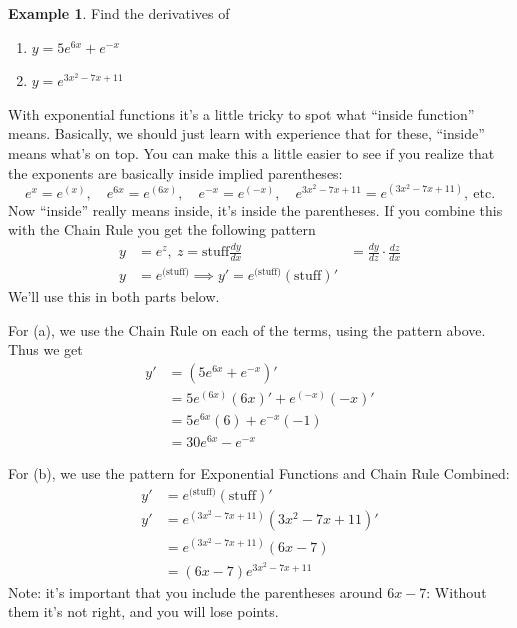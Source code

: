 \documentclass[oneside]{book}
\newcommand{\deriv}[2]{\frac{d#1}{d#2}}
\theoremstyle{definition}
\newtheorem{example}{Example}
\theoremstyle{solution}
\newtheorem*{solution}{Solution}
\newenvironment{solution}{\vspace{2in}\comment}{\endcomment}
\begin{document}
\begin{example}
Find the derivatives of 
\begin{enumerate}    
  \item $y = 5e^{6x} +e^{-x}$
  \item $y = e^{3x^2-7x+11}$
\end{enumerate}
\end{example}

\begin{solution} 
  With exponential functions it's a little tricky to spot what
  ``inside function'' means.  Basically, we should just learn with
  experience that for these, ``inside'' means what's on top.  You can
  make this a little easier to see if you realize that the exponents
  are basically inside implied parentheses:
$$
e^x = e^{(x)},\quad
e^{6x} = e^{(6x)},\quad
e^{-x} = e^{(-x)},\quad
e^{3x^2-7x+11} = e^{(3x^2-7x+11)},\ \text{etc.}
$$
Now ``inside'' really means inside, it's inside the parentheses.  If
you combine this with the Chain Rule you get the following pattern
  \begin{align*}
    y & = e^z,\ z=\text{stuff}
    \deriv{y}{x} & = \deriv{y}{z}\cdot \deriv{z}{x}\\
    y & = e^{\text{(stuff)}} \implies y' = e^{\text{(stuff)}} (\text{stuff})'
  \end{align*}
We'll use this in both parts below.
\bigskip

For (a), we use the Chain Rule on each of the terms, using the pattern
above.  Thus we get
\begin{align*}
  y' & =(5e^{6x}+e^{-x})'\\
     & = 5e^{(6x)}(6x)' + e^{(-x)}(-x)'\\
     & = 5e^{6x}(6)+e^{-x}(-1)\\
     & = 30e^{6x} - e^{-x}
\end{align*}
\bigskip

For (b), we use  the pattern for Exponential Functions and Chain Rule Combined:
\begin{align*}
  y' & = e^{\text{(stuff)}} (\text{stuff})'\\
  y' & =  e^{(3x^2-7x+11)}(3x^2-7x+11)'\\
     & =  e^{(3x^2-7x+11)}(6x-7)\\
     & = (6x-7)e^{3x^2-7x+11}
\end{align*}
Note: it's important that you include the parentheses around $6x-7$:
Without them it's not right, and you will lose points.
\end{solution}
\end{document}
